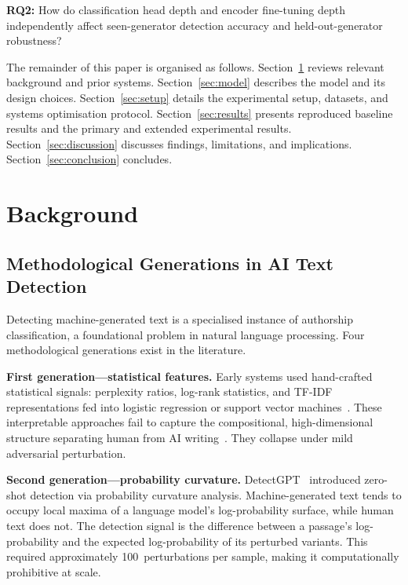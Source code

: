 \documentclass[conference]{IEEEtran}
\begin{document}
\smallskip
\noindent\textbf{RQ2:} How do classification head depth and encoder
fine-tuning depth independently affect seen-generator detection accuracy and
held-out-generator robustness?

\smallskip
The remainder of this paper is organised as follows. Section~\ref{sec:bg}
reviews relevant background and prior systems. Section~\ref{sec:model}
describes the model and its design choices.
Section~\ref{sec:setup} details the experimental setup, datasets, and systems
optimisation protocol. Section~\ref{sec:results} presents reproduced
baseline results and the primary and extended experimental results.
Section~\ref{sec:discussion} discusses findings, limitations, and
implications. Section~\ref{sec:conclusion} concludes.

\section{Background}\label{sec:bg}

\subsection{Methodological Generations in AI Text Detection}

Detecting machine-generated text is a specialised instance of authorship
classification, a foundational problem in natural language processing.
Four methodological generations exist in the literature.

\textbf{First generation---statistical features.} Early systems used
hand-crafted statistical signals: perplexity ratios, log-rank statistics,
and TF-IDF representations fed into logistic regression or support vector
machines~\cite{jawahar2020}. These interpretable approaches fail to capture
the compositional, high-dimensional structure separating human from AI
writing~\cite{goodfellow2016}. They collapse under mild adversarial perturbation.

\textbf{Second generation---probability curvature.} DetectGPT~\cite{mitchell2023}
introduced zero-shot detection via probability curvature analysis.
Machine-generated text tends to occupy local maxima of a language model's
log-probability surface, while human text does not. The detection signal
is the difference between a passage's log-probability and the expected
log-probability of its perturbed variants. This required approximately
100~perturbations per sample, making it computationally prohibitive at scale.
\end{document}
